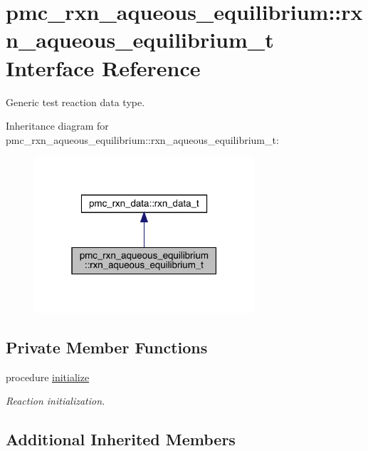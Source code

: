 \hypertarget{structpmc__rxn__aqueous__equilibrium_1_1rxn__aqueous__equilibrium__t}{}\section{pmc\+\_\+rxn\+\_\+aqueous\+\_\+equilibrium\+:\+:rxn\+\_\+aqueous\+\_\+equilibrium\+\_\+t Interface Reference}
\label{structpmc__rxn__aqueous__equilibrium_1_1rxn__aqueous__equilibrium__t}


Generic test reaction data type.  




Inheritance diagram for pmc\+\_\+rxn\+\_\+aqueous\+\_\+equilibrium\+:\+:rxn\+\_\+aqueous\+\_\+equilibrium\+\_\+t\+:\nopagebreak
\begin{figure}[H]
\begin{center}
\leavevmode
\includegraphics[width=232pt]{structpmc__rxn__aqueous__equilibrium_1_1rxn__aqueous__equilibrium__t__inherit__graph}
\end{center}
\end{figure}
\subsection*{Private Member Functions}
\begin{DoxyCompactItemize}
\item 
procedure \mbox{\hyperlink{structpmc__rxn__aqueous__equilibrium_1_1rxn__aqueous__equilibrium__t_a103c23f4a3cd48b0228183d817a8d23e}{initialize}}
\begin{DoxyCompactList}\small\item\em Reaction initialization. \end{DoxyCompactList}\end{DoxyCompactItemize}
\subsection*{Additional Inherited Members}


